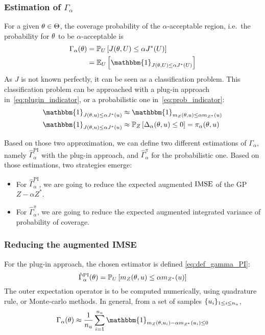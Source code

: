 \documentclass[../../Main_ManuscritThese.tex]{subfiles}
\begin{document}
\subsubsection{Estimation of $\Gamma_{\alpha}$}

For a given $\theta\in\Theta$, the coverage probability of the $\alpha$-acceptable region, i.e.\ the probability for $\theta$ to be $\alpha$-acceptable is
\begin{align}
  \Gamma_{\alpha}(\kk) &= \Prob_{U}\left[J(\kk,\UU) \leq \alpha J^*(\UU)\right] \\
                              & =\Ex_{U}\left[\mathbbm{1}_{J(\kk,\UU) \leq \alpha J^*(\UU)}\right]
\end{align}
As $J$ is not known perfectly, it can be seen as a classification problem.
This classification problem can be approached with a plug-in approach in~\cref{eq:plugin_indicator}, or a probabilistic one in~\cref{eq:prob_indicator}:
\begin{align}
  \mathbbm{1}_{J(\kk,\uu) \leq \alpha J^*(\uu)} &\approx   \mathbbm{1}_{m_Z(\kk,\uu) \leq \alpha m_{{Z^*}}(\uu)} \label{eq:plugin_indicator} \\
  \mathbbm{1}_{J(\kk,\uu) \leq \alpha J^*(\uu)} &\approx   \Prob_{Z}\left[ \Delta_{\alpha}(\kk,\uu) \leq 0 \right] = \pi_{\alpha}(\kk,\uu) \label{eq:prob_indicator}
\end{align}

Based on those two approximation, we can define two different estimations of $\Gamma_\alpha$, namely $\hat{\Gamma}_\alpha^{\mathrm{PI}}$ with the plug-in approach, and $\hat{\Gamma}_{\alpha}^{\pi}$ for the probabilistic one. Based on those estimations, two strategies emerge:
\begin{itemize}
\item For $\hat{\Gamma}_{\alpha}^{\mathrm{PI}}$, we are going to reduce the expected augmented $\operatorname{\mathrm{IMSE}}$ of the GP $Z - \alpha Z^*$.
\item For $\hat{\Gamma}_{\alpha}^{\pi}$, we are going to reduce the expected augmented integrated variance of probability of coverage.
\end{itemize}

\subsubsection{Reducing the augmented IMSE}
For the plug-in approach, the chosen estimator is defined \cref{eq:def_gamma_PI}:
  \begin{equation}
    \label{eq:def_gamma_PI}
    \hat{\Gamma}_{\alpha}^{\mathrm{PI}}(\theta) = \mathbb{P}_U\left[m_Z(\theta,u) \leq \alpha m_{{Z^*}}(u) \right]
  \end{equation}
  The outer expectation operator is to be computed numerically, using quadrature rule, or Monte-carlo methods. In general, from a set of samples $\{u_i\}_{1\leq i \leq n_{u}}$,
  \begin{equation}
    \Gamma_{\alpha}(\kk) \approx \frac{1}{n_{\uu}}\sum_{i=1}^{n_{\uu}} \mathbbm{1}_{m_Z(\kk, \uu_i) - \alpha m_{Z^*}(\uu_i)\leq 0}
  \end{equation}
\end{document}
